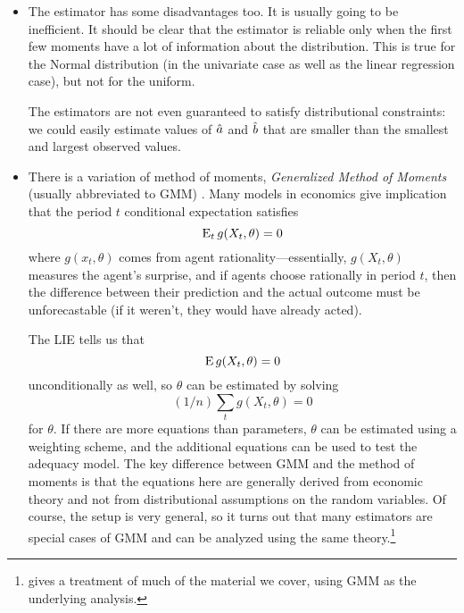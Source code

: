 \begin{itemize}[leftmargin=0pt]
\item The estimator has some disadvantages too.  It is usually going
  to be inefficient.  It should be clear that the estimator is
  reliable only when the first few moments have a lot of information
  about the distribution.  This is true for the Normal distribution
  (in the univariate case as well as the linear regression case), but
  not for the uniform.

  The estimators are not even guaranteed to satisfy distributional
  constraints: we could easily estimate values of $\hat{a}$ and $\hat{b}$ that
  are smaller than the smallest and largest observed values.

\item There is a variation of method of moments, \emph{Generalized
    Method of Moments} (usually abbreviated to GMM) \citep[derived
  by][as part of his Ph.D. dissertation]{Han:82}.  Many models in
  economics give implication that the period $t$ conditional
  expectation satisfies 
  \begin{equation*}
    \operatorname{E}_t g(X_t, \theta) = 0
  \end{equation*}
  where $g(x_t, \theta)$ comes from agent rationality---essentially,
  $g(X_t,\theta)$ measures the agent's surprise, and if agents choose
  rationally in period $t$, then the difference between their
  prediction and the actual outcome must be unforecastable (if it
  weren't, they would have already acted).

  The LIE tells us that
  \begin{equation*}
    \operatorname{E} g(X_t, \theta) = 0
  \end{equation*}
  unconditionally as well, so $\theta$ can be estimated by solving
  \begin{equation*}
    (1/n) \sum_t g(X_t, \theta) = 0
  \end{equation*}
  for $\theta$.  If there are more equations than parameters, $\theta$ can be
  estimated using a weighting scheme, and the additional equations can
  be used to test the adequacy model.  The key difference between GMM
  and the method of moments is that the equations here are generally
  derived from economic theory and not from distributional assumptions
  on the random variables.  Of course, the setup is very general, so
  it turns out that many estimators are special cases of GMM and can
  be analyzed using the same theory.\footnote{\citet{Hay:00} gives a
    treatment of much of the material we cover, using GMM as the
    underlying analysis.}

\end{itemize}


